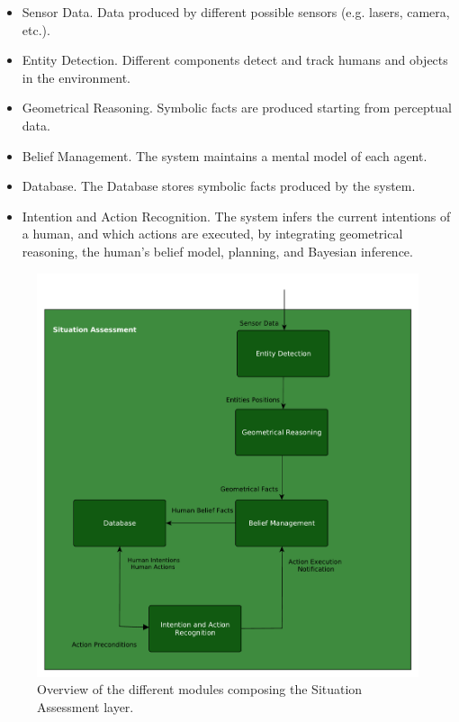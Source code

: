\begin{itemize}
\item Sensor Data. Data produced by different possible sensors (e.g. lasers, camera, etc.).
\item Entity Detection. Different components detect and track humans and objects in the environment.
\item Geometrical Reasoning. Symbolic facts are produced starting from perceptual data.
\item Belief Management. The system maintains a mental model of each agent.
\item Database. The Database stores symbolic facts produced by the system.
\item Intention and Action Recognition. The system infers the current intentions of a human, and which actions are executed, by integrating  geometrical reasoning, the human's belief model, planning, and Bayesian inference.
\end{itemize}

 \begin{figure}[ht!]
	\centering
	\includegraphics[scale=0.45]{img/observer/situation_assessment_overview.pdf}
	\caption{Overview of the different modules composing the Situation Assessment layer.}
	\label{fig:belief_management-belief_management_overview}
\end{figure}

